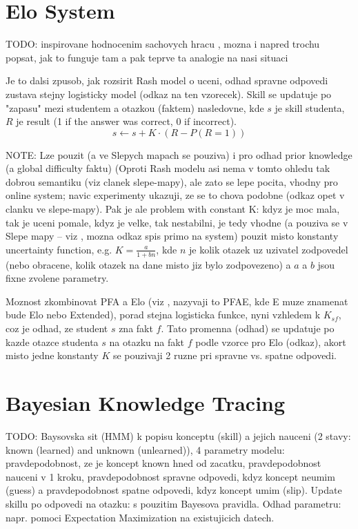 \documentclass[a4paper, 12pt, twoside]{fithesis2}		%
\renewcommand{\_}{\leavevmode \kern0.07em\vbox{\hrule width0.4em}}
\begin{document}
\section{Elo System}
\label{sec:elo}


TODO: inspirovane hodnocenim sachovych hracu \cite{elo-rating}, mozna i napred trochu popsat, jak to funguje tam a pak teprve ta analogie na nasi situaci

Je to dalsi zpusob, jak rozsirit Rash model o uceni, odhad spravne odpovedi zustava stejny logisticky model (odkaz na ten vzorecek). Skill se updatuje po "zapasu" mezi studentem a otazkou (faktem) nasledovne,
kde $s$ je skill studenta, $R$ je result (1 if the answer was correct, 0 if incorrect).
$$
s \gets s + K \cdot (R - P(R = 1))
$$

NOTE: Lze pouzit (a ve Slepych mapach \cite{slepe-mapy} se pouziva) i pro odhad prior knowledge (a global difficulty faktu)
(Oproti Rash modelu asi nema v tomto ohledu tak dobrou semantiku (viz clanek slepe-mapy), ale zato se lepe pocita, vhodny pro online system; navic experimenty ukazuji, ze se to chova podobne (odkaz opet v clanku ve slepe-mapy).
Pak je ale problem with constant K: kdyz je moc mala, tak je uceni pomale, kdyz je velke, tak nestabilni, je tedy vhodne (a pouziva se v Slepe mapy -- viz \cite{slepe-mapy}, mozna odkaz spis primo na system) pouzit misto konstanty
uncertainty function, e.g. $K = \frac{a}{1 + bn}$, kde $n$ je kolik otazek uz uzivatel zodpovedel (nebo obracene, kolik otazek na dane misto jiz bylo zodpovezeno) a $a$ a $b$ jsou fixne zvolene parametry.

Moznost zkombinovat PFA a Elo (viz \cite{slepe-mapy}, nazyvaji to PFAE, kde E muze znamenat bude Elo nebo Extended), porad stejna logisticka funkce, nyni vzhledem k $K_{sf}$, coz je odhad, ze student $s$ zna fakt $f$. Tato promenna (odhad) se updatuje po kazde otazce studenta $s$ na otazku na fakt $f$ podle vzorce pro Elo (odkaz), akort misto jedne konstanty $K$ se pouzivaji 2 ruzne pri spravne vs. spatne odpovedi.


\section{Bayesian Knowledge Tracing}
\label{sec:bayesian-network}

TODO: Baysovska sit (HMM) k popisu konceptu (skill) a jejich nauceni (2 stavy: known (learned) and unknown (unlearned)), 4 parametry modelu: pravdepodobnost, ze je koncept known hned od zacatku, pravdepodobnost nauceni v 1 kroku, pravdepodobnost spravne odpovedi, kdyz koncept neumim (guess) a pravdepodobnost spatne odpovedi, kdyz koncept umim (slip).
Update skillu po odpovedi na otazku: s pouzitim Bayesova pravidla.
Odhad parametru: napr. pomoci Expectation Maximization na existujicich datech.
\end{document}
